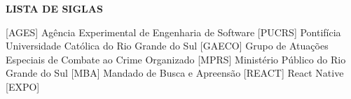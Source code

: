 
\begin{center}
  \uppercase{\bfseries lista de siglas}\\[3em]
\end{center}

\begin{acronym}[XXXXXXXX]
   [AGES] {Agência Experimental de Engenharia de Software}
   [PUCRS] {Pontifícia Universidade Católica do Rio Grande do Sul}
   [GAECO] {Grupo de Atuações Especiais de Combate ao Crime Organizado}
   [MPRS] {Ministério Público do Rio Grande do Sul}
   [MBA] {Mandado de Busca e Apreensão}
   [REACT] {React Native}
   [EXPO] {}
\end{acronym}